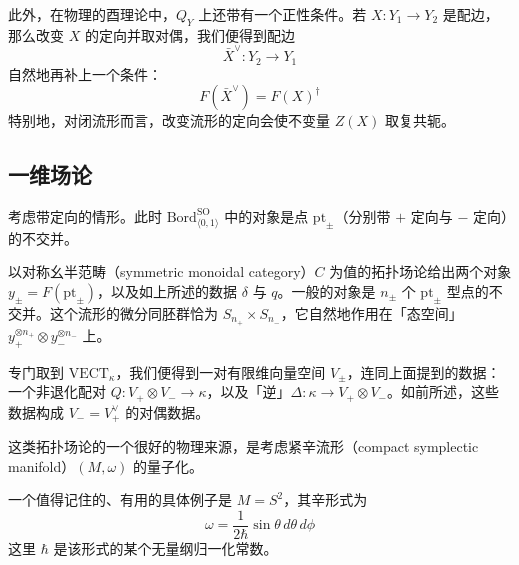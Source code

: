 此外，在物理的酉理论中，$Q_Y$ 上还带有一个正性条件。若 $X: Y_1\to Y_2$ 是配边，那么改变 $X$ 的定向并取对偶，我们便得到配边
\begin{equation}
  \bar X^\vee: Y_2\to Y_1
  \tag{5.26}
  \label{eq:5.26}
\end{equation}
自然地再补上一个条件：
\begin{equation}
  F(\bar X^\vee)=F(X)^\dagger
  \tag{5.27}
  \label{eq:5.27}
\end{equation}
特别地，对闭流形而言，改变流形的定向会使不变量 $Z(X)$ 取复共轭。

\subsection{一维场论} %

考虑带定向的情形。此时 $\mathrm{Bord}^{\mathrm{SO}}_{\langle 0,1\rangle}$ 中的对象是点 $\mathrm{pt}_\pm$（分别带 $+$ 定向与 $-$ 定向）的不交并。

以对称幺半范畴（symmetric monoidal category）$C$ 为值的拓扑场论给出两个对象 $y_\pm=F(\mathrm{pt}_\pm)$，以及如上所述的数据 $\delta$ 与 $q$。一般的对象是 $n_\pm$ 个 $\mathrm{pt}_\pm$ 型点的不交并。这个流形的微分同胚群恰为 $S_{n_+}\times S_{n_-}$，它自然地作用在「态空间」$y_+^{\otimes n_+}\otimes y_-^{\otimes n_-}$ 上。

专门取到 $\mathrm{VECT}_\kappa$，我们便得到一对有限维向量空间 $V_\pm$，连同上面提到的数据：一个非退化配对 $Q: V_+\otimes V_-\to\kappa$，以及「逆」$\Delta: \kappa\to V_+\otimes V_-$。如前所述，这些数据构成 $V_-=V_+^\vee$ 的对偶数据。

这类拓扑场论的一个很好的物理来源，是考虑紧辛流形（compact symplectic manifold）$(M,\omega)$ 的量子化。

一个值得记住的、有用的具体例子是 $M=S^2$，其辛形式为
\begin{equation}
  \omega=\frac{1}{2\hbar}\sin\theta\, d\theta\, d\phi
  \tag{5.28}
  \label{eq:5.28}
\end{equation}
这里 $\hbar$ 是该形式的某个无量纲归一化常数。

